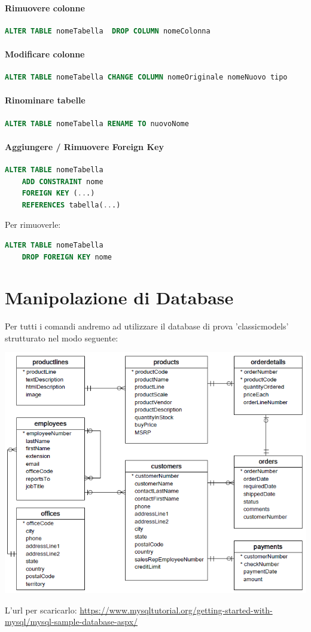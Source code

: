 \documentclass[12pt,a4paper]{article}
\begin{document}
\paragraph{Rimuovere colonne\\}
\flushleft
\begin{lstlisting}[language = SQL]
ALTER TABLE nomeTabella  DROP COLUMN nomeColonna
\end{lstlisting}

\paragraph{Modificare colonne\\}
\flushleft
\begin{lstlisting}[language = SQL]
ALTER TABLE nomeTabella CHANGE COLUMN nomeOriginale nomeNuovo tipo
\end{lstlisting}

\paragraph{Rinominare tabelle\\}
\flushleft
\begin{lstlisting}[language = SQL]
ALTER TABLE nomeTabella RENAME TO nuovoNome
\end{lstlisting}

\paragraph{Aggiungere / Rimuovere Foreign Key}
\flushleft
\begin{lstlisting}[language = SQL]
ALTER TABLE nomeTabella
    ADD CONSTRAINT nome
    FOREIGN KEY (...)
    REFERENCES tabella(...)
\end{lstlisting}
Per rimuoverle:
\begin{lstlisting}[language = SQL]
ALTER TABLE nomeTabella
    DROP FOREIGN KEY nome
\end{lstlisting}

\clearpage \section{Manipolazione di Database}
Per tutti i comandi andremo ad utilizzare il database di prova 'classicmodels' strutturato nel modo seguente:
\begin{center}
\includegraphics[width=0.6\columnwidth]{img/classicmodels.png}
\end{center}
L'url per scaricarlo: \url{https://www.mysqltutorial.org/getting-started-with-mysql/mysql-sample-database-aspx/}
\end{document}
